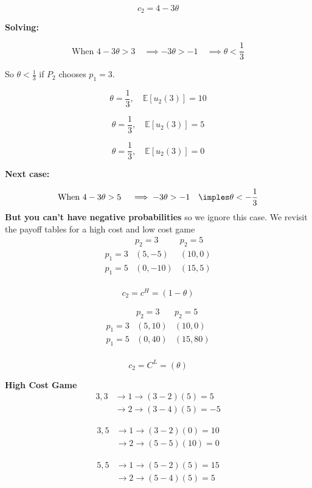 \documentclass{article}
\begin{document}
\[
c_2 = 4 - 3\theta
\]

\textbf{Solving:}

\[
\text{When } 4 - 3\theta > 3 \quad \implies -3\theta > -1 \quad \implies \theta < \frac{1}{3}
\]

So \( \theta < \frac{1}{3} \) if \( P_2 \) chooses \( p_1 = 3 \).

\[
\theta = \frac{1}{3}, \quad \mathbb{E}[u_2(3)] = 10
\]

\[
\theta = \frac{1}{3}, \quad \mathbb{E}[u_2(3)] = 5
\]

\[
\theta = \frac{1}{3}, \quad \mathbb{E}[u_2(3)] = 0
\]

\textbf{Next case:}

\[
\text{When } 4 - 3\theta > 5 \quad \implies -3\theta > -1 \quad \imples \theta < -\frac{1}{3}
\]
\textbf{But you can't have negative probabilities} so we ignore this case. We revisit the payoff tables for a high cost and low cost game
\[
\begin{array}{c|cc}
    & p_2 = 3 & p_2 = 5 \\
    \hline
    p_1 = 3 & (5,-5) & (10,0) \\
    p_1 = 5 & (0,-10) & (15,5) \\
\end{array}
\]

\[
c_2 = c^H = (1 - \theta)
\]

\[
\begin{array}{c|cc}
    & p_2 = 3 & p_2 = 5 \\
    \hline
    p_1 = 3 & (5,10) & (10,0) \\
    p_1 = 5 & (0,40) & (15,80) \\
\end{array}
\]

\[
c_2 = C^L = (\theta)
\]

\textbf{High Cost Game}
\begin{align*}
    3,3 &\to 1 \to (3 - 2)(5) = 5 \\
    &\to 2 \to (3 - 4)(5) = -5
\end{align*}

\begin{align*}
    3,5 &\to 1 \to (3 - 2)(0) = 10 \\
    &\to 2 \to (5 - 5)(10) = 0
\end{align*}

\begin{align*}
    5,5 &\to 1 \to (5 - 2)(5) = 15 \\
    &\to 2 \to (5 - 4)(5) = 5
\end{align*}
\end{document}
